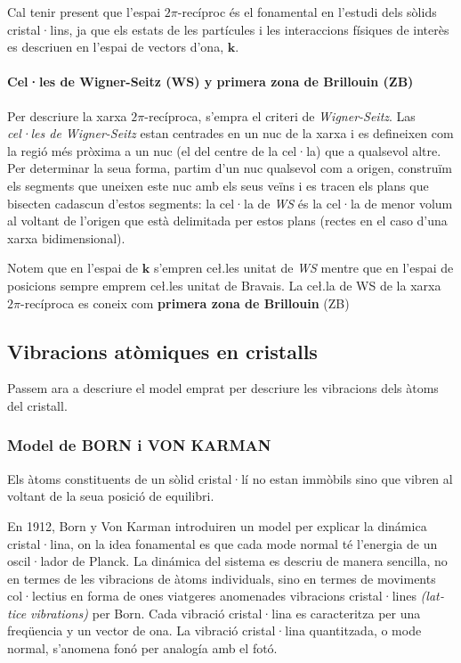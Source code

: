 \documentclass[12pt]{article} %
\let\vec\mathbf %
\begin{document}
{Cal tenir present que l'espai $2\pi$-recíproc és el fonamental en l'estudi dels sòlids cristal·lins, ja que els estats de les partícules i les interaccions físiques de interès es descriuen en l'espai de vectors d'ona, $\vec k$.


\paragraph{Cel·les de Wigner-Seitz (WS) y primera zona de Brillouin (ZB)}

Per descriure la xarxa $2\pi$-recíproca, s'empra el criteri de \textit{Wigner-Seitz}. Las \textit{cel·les de Wigner-Seitz} estan centrades en un nuc de la xarxa i es defineixen com la regió més pròxima a un nuc (el del centre de la cel·la) que a qualsevol altre. Per determinar la seua forma, partim d'un nuc qualsevol com a origen, construïm els segments que uneixen este nuc amb els seus veïns i es tracen els plans que bisecten cadascun d'estos segments: la cel·la de \emph{WS} és la cel·la de menor volum al voltant de l'origen que està delimitada per estos plans (rectes en el caso d'una xarxa bidimensional).

Notem que en l'espai de $\vec k$ s'empren ce\l.les unitat de \emph{WS} mentre que en l'espai de posicions sempre emprem ce\l.les unitat de Bravais.
La ce\l.la de WS de la xarxa $2\pi$-recíproca es coneix com \textbf{primera zona de Brillouin} (ZB)


\subsection{Vibracions atòmiques en cristalls}
Passem ara a descriure el model emprat per descriure les vibracions dels àtoms del cristall.
\subsubsection{Model de BORN i VON KARMAN}
Els àtoms constituents de un sòlid cristal·lí no estan immòbils sino que vibren al voltant de la seua posició de equilibri.

En 1912, Born y Von Karman \cite{Born:1912:SRG} introduiren un model per explicar la dinámica cristal·lina, on la idea fonamental es que cada mode normal té l'energia de un oscil·lador de Planck. La dinámica del sistema es descriu de manera sencilla, no en termes de les vibracions de àtoms individuals, sino en termes de moviments col·lectius en forma de ones viatgeres anomenades vibracions cristal·lines \emph{(\foreignlanguage{english}{lattice vibrations})} per Born. Cada vibració cristal·lina es caracteritza per una freqüencia y un vector de ona.
La vibració cristal·lina quantitzada, o mode normal, s'anomena fonó per analogía amb el fotó. %

}
\end{document}
